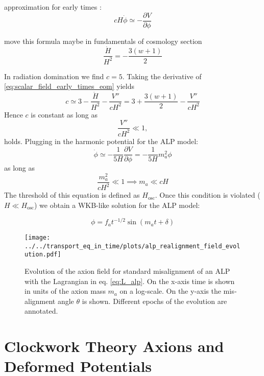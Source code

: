 \documentclass[master,       %
               twoside,        %
               BCOR10mm,       %
               english,ngerman, %
               ]{GAUBM}
\begin{document}
\begin{otherlanguage}{english}
approximation for early times \cite[appendix A]{early_scalar_field_dynamics_PhysRevD.84.123506}:
\begin{equation}
	\label{eq:scalar_field_early_times_eom}
	c H \dot{\phi} \simeq - \frac{\partial V}{\partial \phi}
\end{equation}

move this formula maybe in fundamentals of cosmology section
\begin{equation}
	\frac{\dot{H}}{H^2} = - \frac{3(w + 1)}{2}
\end{equation}

In radiation domination we find $c = 5$.
Taking the derivative of \eqref{eq:scalar_field_early_times_eom} yields
\begin{equation}
	c \simeq 3 - \frac{\dot{H}}{H^2} - \frac{V''}{c H^2}
	= 3 + \frac{3(w + 1)}{2} - \frac{V''}{c H^2}
\end{equation}
Hence $c$ is constant as long as
\begin{equation}
	\frac{V''}{c H^2} \ll 1,
\end{equation}
holds.
Plugging in the harmonic potential for the ALP model:
\begin{equation}
	\dot{\phi} \simeq - \frac{1}{5 H} \frac{\partial V}{\partial \phi} = - \frac{1}{5 H} m_a^2 \phi
\end{equation}
as long as
\begin{equation}
	\frac{m_a^2}{c H^2} \ll 1 \implies m_a \ll c H
\end{equation}
The threshold of this equation is defined as $H_\mathrm{osc}$.
Once this condition is violated ($H \ll H_\mathrm{osc}$) we obtain a WKB-like solution for the ALP model:

\begin{equation}
	\phi = f_a t^{-1/2} \sin(m_a t + \delta)
\end{equation}


\begin{figure}[h]
    \texttt{[image: ../../transport\_eq\_in\_time/plots/alp\_realignment\_field\_evolution.pdf]}
    \caption{Evolution of the axion field for standard misalignment of an ALP with the Lagrangian in eq. \eqref{eq:L_alp}. On the x-axis time is shown in units of the axion mass $m_a$ on a log-scale. On the y-axis the misalignment angle $\theta$ is shown. Different epochs of the evolution are annotated.}
\end{figure}

\section{Clockwork Theory Axions and Deformed Potentials}


\end{otherlanguage}
\end{document}
